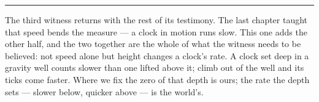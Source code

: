 %
%
%
%

\bigskip
\begin{center}
\rule{0.4\textwidth}{0.4pt}
\end{center}
\bigskip

\noindent The third witness returns with the rest of its testimony. The last chapter taught that speed bends the
measure --- a clock in motion runs slow. This one adds the other half, and the two together are the whole of
what the witness needs to be believed: not speed alone but height changes a clock's rate. A clock set deep in a
gravity well counts slower than one lifted above it; climb out of the well and its ticks come faster. Where we
fix the zero of that depth is ours; the rate the depth sets --- slower below, quicker above --- is the world's.

